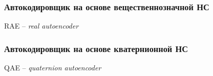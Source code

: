 \begin{frame}[t]
\frametitle{Автокодировщик на основе вещественнозначной НС}

\begin{block}{\centering RAE -- \emph{real autoencoder}}
    \centering
%  
\end{block}
\end{frame}


\begin{frame}[t]
\frametitle{Автокодировщик на основе кватернионной НС}

\begin{block}{\centering QAE -- \emph{quaternion autoencoder}}
    \centering
%  
\end{block}
\end{frame}
